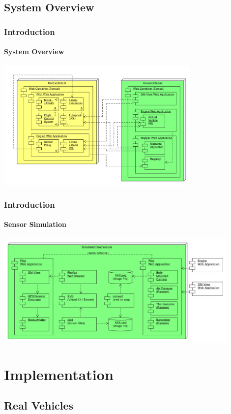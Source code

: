 \documentclass{beamer}
\begin{document}
\subsection{System Overview}

\begin{frame}\frametitle{Introduction}\framesubtitle{System Overview}
	\begin{center}
		{\includegraphics[width=10cm]{SystemOverview.pdf}}
	\end{center}
\end{frame}

\begin{frame}\frametitle{Introduction}\framesubtitle{Sensor Simulation}
	\begin{center}
		{\includegraphics[width=12cm]{SensorSimulation-2.pdf}}
	\end{center}
\end{frame}

\section {Implementation}

\subsection{Real Vehicles}
\end{document}
